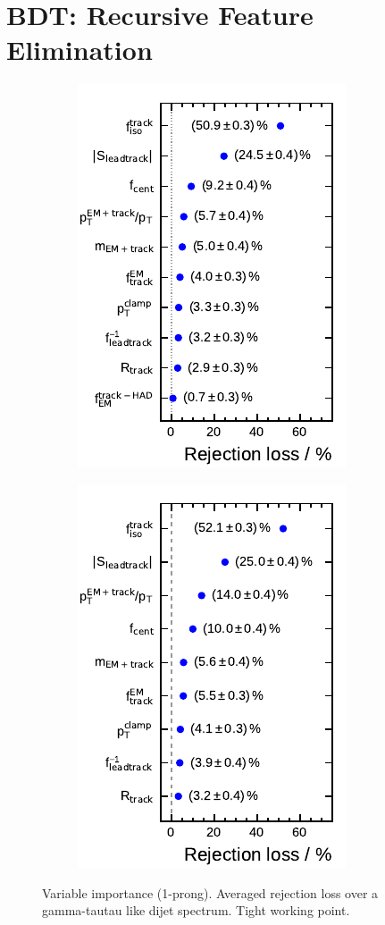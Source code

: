 \clearpage
\section{BDT: Recursive Feature Elimination}

\begin{figure}[htb]
  \centering
  \begin{subfigure}[t]{0.33\textwidth}
    \centering
    \includegraphics{./figures/bdt_perf/var_importance/1p_iter1.pdf}
  \end{subfigure}
  \begin{subfigure}[t]{0.33\textwidth}
    \centering
    \includegraphics{./figures/bdt_perf/var_importance/1p_iter2.pdf}
  \end{subfigure}
  \caption{Variable importance (1-prong). Averaged rejection loss over a
    gamma-tautau like dijet spectrum. Tight working point.}
  \label{fig:variable_importance_1p_app}
\end{figure}

